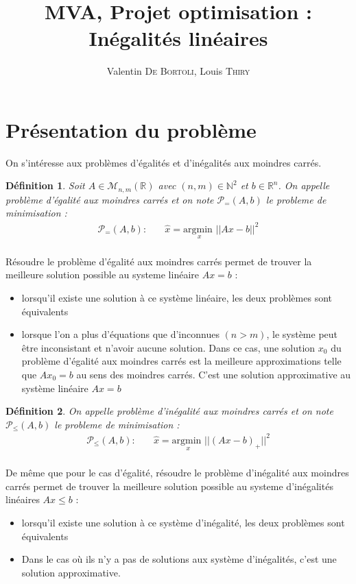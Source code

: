 \documentclass[10pt,a4paper]{article}
\title{MVA, Projet optimisation : Inégalités linéaires}
\author{Valentin \textsc{De Bortoli}, Louis \textsc{Thiry}}
\newtheorem{mydef}{Définition}
\begin{document}
\maketitle
\tableofcontents

\section{Présentation du problème}

On s'intéresse aux problèmes d'égalités et d'inégalités aux moindres carrés.

\begin{mydef}
  Soit $A \in \mathcal{M}_{n,m}(\mathbb{R})$ avec $(n,m) \in \mathbb{N}^2$ et $b \in \mathbb{R}^{n}$.
    On appelle problème d'égalité aux moindres carrés et on note $\mathcal{P}_{=} (A, b)$ le probleme de minimisation :
    \begin{align*}
      \mathcal{P}_{=}(A, b): \quad & \hat{x} = \underset{x}{\text{argmin }}  ||Ax - b||^{2}\\
    \end{align*}
\end{mydef}
Résoudre le problème d'égalité aux moindres carrés permet de trouver la meilleure solution possible au systeme linéaire $Ax = b$ :
\begin{itemize}
  \item lorsqu'il existe une solution à ce système linéaire, les deux problèmes sont équivalents
  \item lorsque l'on a plus d'équations que d'inconnues $(n > m)$, le système peut être inconsistant et n'avoir aucune solution.
    Dans ce cas, une solution $x_0$ du problème d'égalité aux moindres carrés est la meilleure approximations telle que $Ax_0 = b$ au sens des moindres carrés.
    C'est une solution approximative au système linéaire $Ax = b$
\end{itemize}

\begin{mydef}
  On appelle problème d'inégalité aux moindres carrés et on note $\mathcal{P}_{\leq} (A, b)$ le probleme de minimisation :
    \begin{align*}
      \mathcal{P}_{\leq} (A, b): \quad & \hat{x} = \underset{x}{\text{argmin }}  ||(Ax - b)_+||^{2}\\
    \end{align*}
\end{mydef}
De même que pour le cas d'égalité, résoudre le problème d'inégalité aux moindres carrés permet de trouver la meilleure solution possible au systeme d'inégalités linéaires $Ax \leq b$ :
\begin{itemize}
  \item lorsqu'il existe une solution à ce système d'inégalité, les deux problèmes sont équivalents
  \item Dans le cas où ils n'y a pas de solutions aux système d'inégalités, c'est une solution approximative.
\end{itemize}
\end{document}
